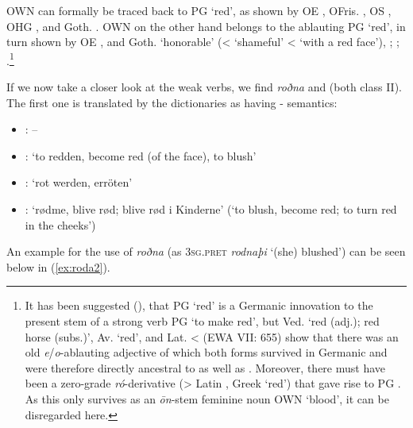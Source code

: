 \documentclass[output=paper,colorlinks,citecolor=brown]{langscibook}
\begin{document}
OWN  can formally be traced back to PG  ‘red’, as shown by OE , OFris. , OS , OHG , and Goth. . OWN  on the other hand belongs to the ablauting PG  ‘red’, in turn shown by OE , and Goth.  ‘honorable’ (< ‘shameful’ < ‘with a red face’), ; ; \citet[71]{Luhr2000}.\footnote{It has been suggested (), that PG  ‘red’ is a Germanic innovation to the present stem of a strong verb PG  ‘to make red’, but Ved.  ‘red (adj.); red horse (subs.)’, Av.  ‘red’, and Lat.  <  (EWA VII: 655) show that there was an old \textit{e}/\textit{o}-ablauting adjective of which both forms survived in Germanic and were therefore directly ancestral to  as well as . Moreover, there must have been a zero-grade \textit{ró}-derivative  (> Latin , Greek  ‘red’) that gave rise to PG . As this only survives as an \textit{ōn}-stem feminine noun OWN  ‘blood’, it can be disregarded here.}

If we now take a closer look at the weak verbs, we find \textit{roðna} and  (both class II). The first one is translated by the dictionaries as having - semantics:

\begin{itemize}
\item {}: –
\item {}: ‘to redden, become red (of the face), to blush’
\item {}: ‘rot werden, erröten’
\item {}: ‘rødme, blive rød; blive rød i Kinderne’ (‘to blush, become red; to turn red in the cheeks’)
\end{itemize}

An example for the use of \textit{roðna} (as \textsc{3sg.pret} \textit{rodnaþi} ‘(she) blushed’) can be seen below in (\ref{ex:roda2}). 
\end{document}
